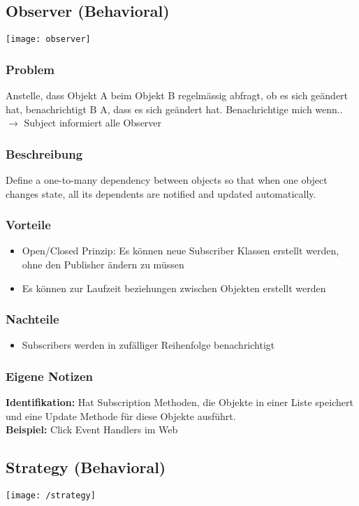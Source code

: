 \subsection{Observer (Behavioral)}
\texttt{[image: observer]}
\subsubsection{Problem}
Anstelle, dass Objekt A beim Objekt B regelmässig abfragt, ob es sich geändert hat, benachrichtigt B A, dass es sich geändert hat. Benachrichtige mich wenn.. $\rightarrow$ Subject informiert alle Observer
\subsubsection{Beschreibung}
Define a one-to-many dependency between objects so that when one object changes state, all its dependents are notified and updated automatically.
\subsubsection{Vorteile}
\begin{itemize}[topsep=0pt]
    \itemsep -0.4em
    \item Open/Closed Prinzip: Es können neue Subscriber Klassen erstellt werden, ohne den Publisher ändern zu müssen
    \item Es können zur Laufzeit beziehungen zwischen Objekten erstellt werden
\end{itemize}
\subsubsection{Nachteile}
\begin{itemize}[topsep=0pt]
    \itemsep -0.4em
    \item Subscribers werden in zufälliger Reihenfolge benachrichtigt
\end{itemize}
\subsubsection{Eigene Notizen}
\textbf{Identifikation:} Hat Subscription Methoden, die Objekte in einer Liste speichert und eine Update Methode für diese Objekte ausführt.\\
\textbf{Beispiel:} Click Event Handlers im Web

\subsection{Strategy (Behavioral)}
\texttt{[image: /strategy]}
